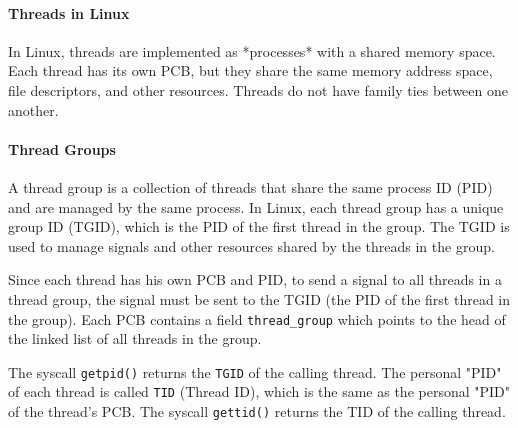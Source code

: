 \documentclass[openany,12pt]{book}
\newcommand{\code}[1]{\texttt{#1}}
\begin{document}
\paragraph{Threads in Linux} In Linux, threads are implemented as *processes* with a shared memory space. Each thread has its own PCB, but they share the same memory address space, file descriptors, and other resources. Threads do not have family ties between one another.

\paragraph{Thread Groups} A thread group is a collection of threads that share the same process ID (PID) and are managed by the same process. In Linux, each thread group has a unique group ID (TGID), which is the PID of the first thread in the group. The TGID is used to manage signals and other resources shared by the threads in the group.

Since each thread has his own PCB and PID, to send a signal to all threads in a thread group, the signal must be sent to the TGID (the PID of the first thread in the group). Each PCB contains a field \code{thread\_group} which points to the head of the linked list of all threads in the group. 

The syscall \code{getpid()} returns the \code{TGID} of the calling thread. The personal "PID" of each thread is called \code{TID} (Thread ID), which is the same as the personal "PID" of the thread's PCB. The syscall \code{gettid()} returns the TID of the calling thread.
\end{document}
